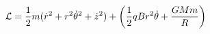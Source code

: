 \documentclass[preview]{standalone}
\begin{document}
\begin{align*}
\mathcal{L}= \frac 12m(\dot{r}^2+r^2\dot{\theta}^2+\dot{z}^2) + \left(\frac12qBr^2\dot{\theta}+{GMm\over R}\right)
\end{align*}
\end{document}
